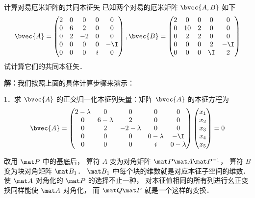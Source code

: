 \begin{example}{计算对易厄米矩阵的共同本征矢}
已知两个对易的厄米矩阵 $\bvec{A,B}$ 如下
\begin{equation}
\bvec{A} = \begin{pmatrix}
2 & 0 & 0&0&0\\
0&6&2&0&0\\
0&2&-2&0&0\\
0&0&0&0&-\I\\
0&0&0&i&0
\end{pmatrix}
,
\bvec{B} = \begin{pmatrix}
2 & 0 & 0&0&0\\
0&10&2&0&0\\
0&2&2&0&0\\
0&0&0&2&-\I\\
0&0&0&\I&2
\end{pmatrix}
\end{equation}
试计算它们的共同本征矢．
\end{example}
\textbf{解：}我们按照上面的具体计算步骤来演示：

1．求 $\bvec{A}$ 的正交归一化本征列矢量：矩阵 $\bvec{A}$ 的本征方程为
\begin{equation}
\bvec{A} = \begin{pmatrix}
2-\lambda & 0 & 0&0&0\\
0&6-\lambda&2&0&0\\
0&2&-2-\lambda&0&0\\
0&0&0&0-\lambda&-\I\\
0&0&0&i&0-\lambda
\end{pmatrix}\begin{pmatrix}
x_1\\
x_2\\
x_3\\
x_4\\
x_5
\end{pmatrix}=0
\end{equation}

改用 $\mat P$ 中的基底后， 算符 $A$ 变为对角矩阵 $\mat P \mat A\mat P^{-1}$， 算符 $B$ 变为块对角矩阵 $\mat B_1$． $\mat B_1$ 中每个块的维数就是对应本征子空间的维数． 使 $\mat A$ 对角化的 $\mat P$ 的选择不止一种， 对本征值相同的所有列进行幺正变换同样能使 $\mat A$ 对角化， 而 $\mat Q\mat P$ 就是一个这样的变换．

